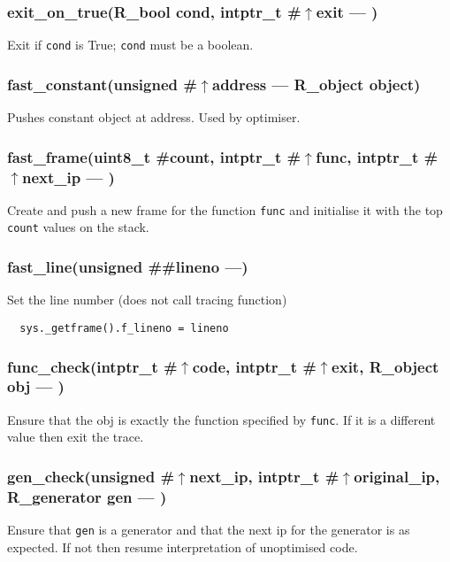 \subsubsection{exit\_on\_true(R\_bool cond, intptr\_t \#$\uparrow$exit --- )}
\vspace{-1em}Exit if \texttt{cond} is True; \texttt{cond} must be a boolean. \vspace{-1em}
\subsubsection{fast\_constant(unsigned \#$\uparrow$address --- R\_object object)}
\vspace{-1em}Pushes constant object at address. Used by optimiser. \vspace{-1em}
\subsubsection{fast\_frame(uint8\_t \#count, intptr\_t \#$\uparrow$func, intptr\_t \#$\uparrow$next\_ip --- )}
\vspace{-1em}Create and push a new frame for the function \texttt{func} and initialise it  with the top \texttt{count} values on the stack. \vspace{-1em}
\subsubsection{fast\_line(unsigned \#\#lineno ---)}
\vspace{-1em}Set the line number (does not call tracing function) \vspace{-1em}\begin{verbatim}
  sys._getframe().f_lineno = lineno
\end{verbatim}
\vspace{-1em}\vspace{-1em}
\subsubsection{func\_check(intptr\_t \#$\uparrow$code, intptr\_t \#$\uparrow$exit, R\_object obj --- )}
\vspace{-1em}Ensure that the obj is exactly the function specified by \texttt{func}. If it is a different value then exit the trace. \vspace{-1em}
\subsubsection{gen\_check(unsigned \#$\uparrow$next\_ip, intptr\_t \#$\uparrow$original\_ip, R\_generator gen --- )}
\vspace{-1em}Ensure that \texttt{gen} is a generator and that the next ip for the generator is as expected. If not then resume interpretation of unoptimised code. \vspace{-1em}
